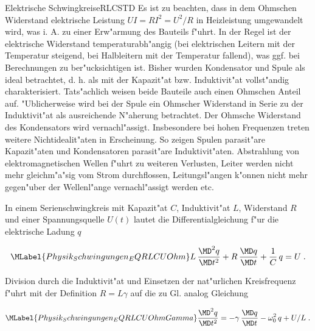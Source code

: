 \begin{MXContent}{Elektrische Schwingkreise}{RLC}{STD}
Es ist zu beachten, dass in dem Ohmschen Widerstand elektrische Leistung $U I = R I^2 = U^2 / R$ in Heizleistung umgewandelt wird, was i. A. zu einer Erw"armung des Bauteils f"uhrt. In der Regel ist der elektrische Widerstand temperaturabh"angig (bei elektrischen Leitern mit der Temperatur steigend, bei Halbleitern mit der Temperatur fallend), was ggf. bei Berechnungen zu ber"ucksichtigen ist. Bisher wurden Kondensator und Spule als ideal betrachtet, d. h. als mit der Kapazit"at bzw. Induktivit"at vollst"andig charakterisiert. Tats"achlich weisen beide Bauteile auch einen Ohmschen Anteil auf. "Ublicherweise wird bei der Spule ein Ohmscher Widerstand in Serie zu der Induktivit"at als ausreichende N"aherung betrachtet. Der Ohmsche Widerstand des Kondensators wird vernachl"assigt. Insbesondere bei hohen Frequenzen treten weitere Nichtidealit"aten in Erscheinung. So zeigen Spulen parasit"are Kapazit"aten und Kondensatoren parasit"are Induktivit"aten. Abstrahlung von elektromagnetischen Wellen f"uhrt zu weiteren Verlusten, Leiter werden nicht mehr gleichm"a"sig vom Strom durchflossen, Leitungsl"angen k"onnen nicht mehr gegen"uber der Wellenl"ange vernachl"assigt werden etc.

\begin{center}
\end{center}

\begin{MInfo}
In einem Serienschwingkreis mit Kapazit"at $C$, Induktivit"at $L$, Widerstand $R$ und einer Spannungsquelle $U(t)$ lautet die Differentialgleichung f"ur die elektrische Ladung $q$

\begin{equation}\MLabel{Physik_Schwingungen_EQRLCUOhm}
  L\, \frac{\MD^2 q }{\MD t^2} + R\, \frac{\MD q }{\MD t} + \frac{1}{C}\, q = U \; .
\end{equation}

Division durch die Induktivit"at und Einsetzen der nat"urlichen Kreisfrequenz f"uhrt mit der Definition $R=L\gamma$ auf die zu Gl. 
analog Gleichung

\begin{equation}\MLabel{Physik_Schwingungen_EQRLCUOhmGamma}
  \frac{\MD^2 q }{\MD t^2} = - \gamma \, \frac{\MD q }{\MD t} - \omega_0^2\,q +  U/L  \; .
\end{equation}



\end{MInfo}
\end{MXContent}
